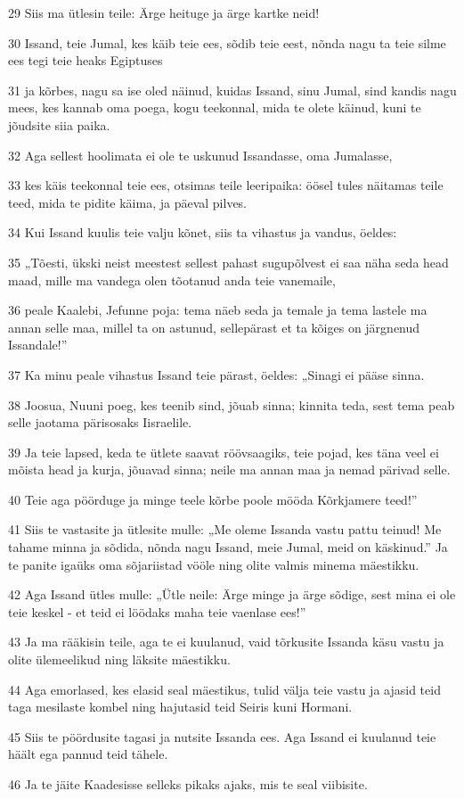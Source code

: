 \par 29 Siis ma ütlesin teile: Ärge heituge ja ärge kartke neid!
\par 30 Issand, teie Jumal, kes käib teie ees, sõdib teie eest, nõnda nagu ta teie silme ees tegi teie heaks Egiptuses
\par 31 ja kõrbes, nagu sa ise oled näinud, kuidas Issand, sinu Jumal, sind kandis nagu mees, kes kannab oma poega, kogu teekonnal, mida te olete käinud, kuni te jõudsite siia paika.
\par 32 Aga sellest hoolimata ei ole te uskunud Issandasse, oma Jumalasse,
\par 33 kes käis teekonnal teie ees, otsimas teile leeripaika: öösel tules näitamas teile teed, mida te pidite käima, ja päeval pilves.
\par 34 Kui Issand kuulis teie valju kõnet, siis ta vihastus ja vandus, öeldes:
\par 35 „Tõesti, ükski neist meestest sellest pahast sugupõlvest ei saa näha seda head maad, mille ma vandega olen tõotanud anda teie vanemaile,
\par 36 peale Kaalebi, Jefunne poja: tema näeb seda ja temale ja tema lastele ma annan selle maa, millel ta on astunud, sellepärast et ta kõiges on järgnenud Issandale!”
\par 37 Ka minu peale vihastus Issand teie pärast, öeldes: „Sinagi ei pääse sinna.
\par 38 Joosua, Nuuni poeg, kes teenib sind, jõuab sinna; kinnita teda, sest tema peab selle jaotama pärisosaks Iisraelile.
\par 39 Ja teie lapsed, keda te ütlete saavat röövsaagiks, teie pojad, kes täna veel ei mõista head ja kurja, jõuavad sinna; neile ma annan maa ja nemad pärivad selle.
\par 40 Teie aga pöörduge ja minge teele kõrbe poole mööda Kõrkjamere teed!”
\par 41 Siis te vastasite ja ütlesite mulle: „Me oleme Issanda vastu pattu teinud! Me tahame minna ja sõdida, nõnda nagu Issand, meie Jumal, meid on käskinud.” Ja te panite igaüks oma sõjariistad vööle ning olite valmis minema mäestikku.
\par 42 Aga Issand ütles mulle: „Ütle neile: Ärge minge ja ärge sõdige, sest mina ei ole teie keskel - et teid ei löödaks maha teie vaenlase ees!”
\par 43 Ja ma rääkisin teile, aga te ei kuulanud, vaid tõrkusite Issanda käsu vastu ja olite ülemeelikud ning läksite mäestikku.
\par 44 Aga emorlased, kes elasid seal mäestikus, tulid välja teie vastu ja ajasid teid taga mesilaste kombel ning hajutasid teid Seiris kuni Hormani.
\par 45 Siis te pöördusite tagasi ja nutsite Issanda ees. Aga Issand ei kuulanud teie häält ega pannud teid tähele.
\par 46 Ja te jäite Kaadesisse selleks pikaks ajaks, mis te seal viibisite.

